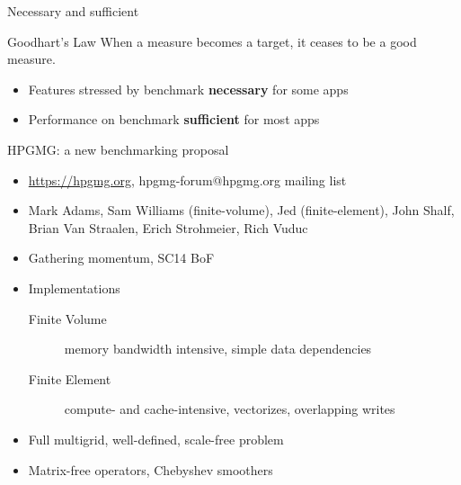 \documentclass{beamer}
\begin{document}
\begin{frame}{Necessary and sufficient}
  \begin{block}{Goodhart's Law}
    When a measure becomes a target, it ceases to be a good measure.
  \end{block}

  \begin{itemize}
  \item Features stressed by benchmark \textbf{necessary} for some apps
  \item Performance on benchmark \textbf{sufficient} for most apps
  \end{itemize}
\end{frame}

\begin{frame}{HPGMG: a new benchmarking proposal}
  \begin{itemize}
  \item \url{https://hpgmg.org}, hpgmg-forum@hpgmg.org mailing list
  \item Mark Adams, Sam Williams (finite-volume), Jed (finite-element), John Shalf, Brian Van Straalen, Erich Strohmeier, Rich Vuduc
  \item Gathering momentum, SC14 BoF
  \item Implementations
    \begin{description}
    \item[Finite Volume] memory bandwidth intensive, simple data dependencies
    \item[Finite Element] compute- and cache-intensive, vectorizes, overlapping writes
    \end{description}
  \item Full multigrid, well-defined, scale-free problem
  \item Matrix-free operators, Chebyshev smoothers
  \end{itemize}
\end{frame}
\end{document}
